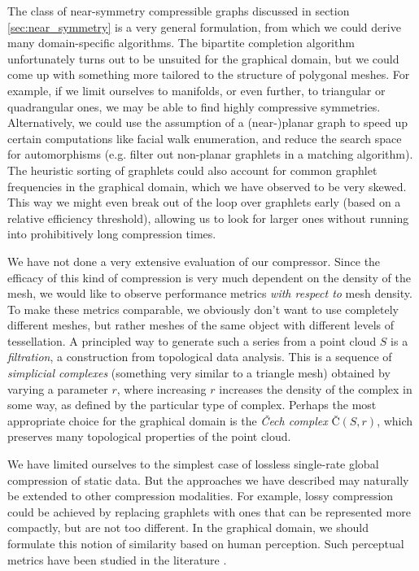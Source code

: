 \documentclass{egpubl}
\begin{document}
The class of near-symmetry compressible graphs discussed in section \ref{sec:near_symmetry} is a very general formulation, from which we could derive many domain-specific algorithms. The bipartite completion algorithm unfortunately turns out to be unsuited for the graphical domain, but we could come up with something more tailored to the structure of polygonal meshes. For example, if we limit ourselves to manifolds, or even further, to triangular or quadrangular ones, we may be able to find highly compressive symmetries.
Alternatively, we could use the assumption of a (near-)planar graph to speed up certain computations like facial walk enumeration, %
and reduce the search space for automorphisms (e.g. filter out non-planar graphlets in a matching algorithm).
The heuristic sorting of graphlets could also account for common graphlet frequencies in the graphical domain, which we have observed to be very skewed. This way we might even break out of the loop over graphlets early (based on a relative efficiency threshold), allowing us to look for larger ones without running into prohibitively long compression times.

We have not done a very extensive evaluation of our compressor. Since the efficacy of this kind of compression is very much dependent on the density of the mesh, we would like to observe performance metrics \textit{with respect to} mesh density. To make these metrics comparable, we obviously don't want to use completely different meshes, but rather meshes of the same object with different levels of tessellation. 
A principled way to generate such a series from a point cloud $S$ is a \textit{filtration}, a construction from topological data analysis.
This is a sequence of \textit{simplicial complexes} (something very similar to a triangle mesh) obtained by varying a parameter $r$, where increasing $r$ increases the density of the complex in some way, as defined by the particular type of complex. Perhaps the most appropriate choice for the graphical domain is the \textit{Čech complex} Č$(S,r)$, which preserves many topological properties of the point cloud.

We have limited ourselves to the simplest case of lossless single-rate global compression of static data. But the approaches we have described may naturally be extended to other compression modalities. For example, lossy compression could be achieved by replacing graphlets with ones that can be represented more compactly, but are not too different. In the graphical domain, we should formulate this notion of similarity based on human perception. Such perceptual metrics have been studied in the literature \cite{corsini2013perceptual}.



%



\end{document}
